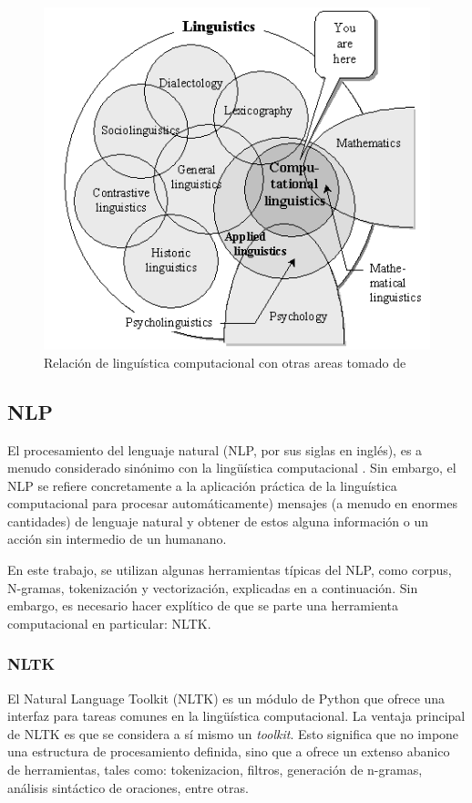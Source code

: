 \documentclass[12pt,letterpaper,twoside]{article}
\begin{document}
\begin{figure}[htbp]
\centering
\includegraphics[width=.9\linewidth]{./assets/mapa_linguistica.png}
\caption{\label{fig:orgb8c3269}Relación de linguística computacional con otras areas tomado de \cite{gelbukh2004}}
\end{figure}


\subsection{NLP}
\label{sec:org7ce2d38}
El procesamiento del lenguaje natural (NLP, por sus siglas en
inglés), es a menudo considerado sinónimo con la lingüística
computacional \cite{gelbukh2004}.  Sin embargo, el NLP se refiere
concretamente a la aplicación práctica de la linguística
computacional para procesar automáticamente) mensajes (a menudo en
enormes cantidades) de lenguaje natural y obtener de estos alguna
información o un acción sin intermedio de un humanano.

En este trabajo, se utilizan algunas herramientas típicas del
NLP, como corpus, N-gramas, tokenización y vectorización, explicadas
en a continuación. Sin embargo, es necesario hacer explítico de
que se parte una herramienta computacional en particular: NLTK.

\subsubsection{NLTK}
\label{sec:org25fa119}
El Natural Language Toolkit (NLTK) es un módulo de Python que ofrece
una interfaz para tareas comunes en la lingüística computacional. La
ventaja principal de NLTK es que se considera a sí mismo un
\emph{toolkit}. Esto significa que no impone una estructura de
procesamiento definida, sino que a ofrece un extenso abanico de
herramientas, tales como: tokenizacion, filtros, generación de
n-gramas, análisis sintáctico de oraciones, entre otras.
\end{document}
